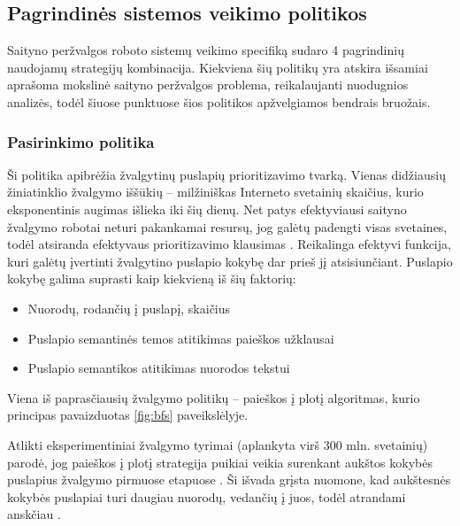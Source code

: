 \subsection{Pagrindinės sistemos veikimo politikos}

Saityno peržvalgos roboto sistemų veikimo specifiką sudaro 4 pagrindinių naudojamų strategijų kombinacija. Kiekviena šių politikų yra atskira išsamiai aprašoma mokslinė saityno peržvalgos problema, reikalaujanti nuodugnios analizės, todėl šiuose punktuose šios politikos apžvelgiamos bendrais bruožais.

\subsubsection{Pasirinkimo politika}

Ši politika apibrėžia žvalgytinų puslapių prioritizavimo tvarką. Vienas didžiausių žiniatinklio žvalgymo iššūkių -- milžiniškas Interneto svetainių skaičius, kurio eksponentinis augimas išlieka iki šių dienų. Net patys efektyviausi saityno žvalgymo robotai neturi pakankamai resursų, jog galėtų padengti visas svetaines, todėl atsiranda efektyvaus prioritizavimo klausimas \cite{EffectiveWebCrawling}. Reikalinga efektyvi funkcija, kuri galėtų įvertinti žvalgytino puslapio kokybę dar prieš jį atsisiunčiant. Puslapio kokybę galima suprasti kaip kiekvieną iš šių faktorių:

\begin{itemize}
    \item Nuorodų, rodančių į puslapį, skaičius
    \item Puslapio semantinės temos atitikimas paieškos užklausai
    \item Puslapio semantikos atitikimas nuorodos tekstui
\end{itemize}


Viena iš paprasčiausių žvalgymo politikų -- paieškos į plotį algoritmas, kurio principas pavaizduotas \ref{fig:bfs} paveikslėlyje.


Atlikti eksperimentiniai žvalgymo tyrimai (aplankyta virš 300 mln. svetainių) parodė, jog paieškos į plotį strategija puikiai veikia surenkant aukštos kokybės puslapius žvalgymo pirmuose etapuose \cite{EffectiveWebCrawling}. Ši išvada grįsta nuomone, kad aukštesnės kokybės puslapiai turi daugiau nuorodų, vedančių į juos, todėl atrandami anskčiau \cite{EffectiveWebCrawling}.



